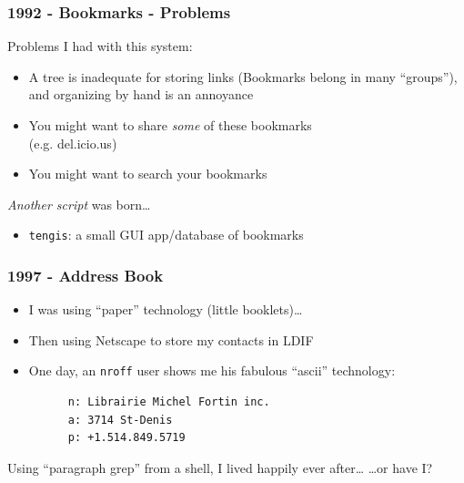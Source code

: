 \documentclass[compress,trans]{beamer}
\begin{document}
\begin{frame}[fragile]
  \frametitle{1992 - Bookmarks - Problems}

  Problems I had with this system:
  \begin{itemize}
    \item A tree is inadequate for storing links (Bookmarks belong in many
      ``groups''), and organizing by hand is an annoyance

    \item You might want to share \textit{some} of these bookmarks \\
      (e.g. del.icio.us)

    \item You might want to search your bookmarks
  \end{itemize}

\vfill\pause
  \emph{Another script} was born\dots
  \begin{itemize}
  \item \texttt{tengis}: a small GUI app/database of bookmarks
  \end{itemize}

\end{frame}


\begin{frame}[fragile]
  \frametitle{1997 - Address Book}

  \begin{itemize}
    \item I was using ``paper'' technology (little booklets)\dots

\vfill\pause
    \item Then using Netscape to store my contacts in LDIF

\vfill\pause
    \item One day, an \texttt{nroff} user shows me his fabulous ``ascii''
      technology:

{\small
\begin{verbatim}
      n: Librairie Michel Fortin inc.
      a: 3714 St-Denis
      p: +1.514.849.5719
\end{verbatim}}
  \end{itemize}

\vfill\pause

  Using ``paragraph grep'' from a shell, I lived happily ever after\dots
\vfill
  \hfill \dots or have I? 

\end{frame}
\end{document}
